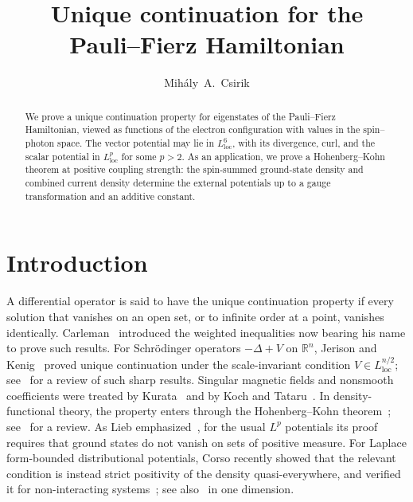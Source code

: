 \documentclass[final,reqno]{amsart}
\title[Unique continuation for the Pauli--Fierz Hamiltonian]{Unique continuation for the\\
Pauli--Fierz Hamiltonian}
\author[M.\,A. Csirik]{Mih\'aly~A.~Csirik}
\theoremstyle{remark}
\newcommand{\RR}{\mathbb{R}}
\begin{document}
\begin{abstract}
We prove a unique continuation property for eigenstates of the Pauli--Fierz
Hamiltonian, viewed as functions of the electron
configuration with values in the spin--photon space.
The vector potential may lie in $L^6_\mathrm{loc}$, with
its divergence, curl, and the scalar potential in $L^p_\mathrm{loc}$ for some
$p>2$.  As an application, we prove a Hohenberg--Kohn theorem at
positive coupling strength: the spin-summed ground-state density and
combined current density determine the external potentials up to a
gauge transformation and an additive constant.
\end{abstract}
\maketitle

\section{Introduction}\label{sec-intro}

A differential operator is said to have the unique continuation property if every
solution that vanishes on an open set, or to infinite order at a point,
vanishes identically.  Carleman~\cite{carleman1939probleme} introduced
the weighted inequalities now bearing his name to prove such
results.  For Schr\"odinger operators $-\Delta+V$ on $\RR^n$,
Jerison and Kenig~\cite{jerison1985unique} proved unique continuation under the scale-invariant
condition $V\in L^{n/2}_\mathrm{loc}$; see~\cite{wolff1993recent} for a
review of such sharp results.  Singular magnetic fields and
nonsmooth coefficients were treated by Kurata~\cite{kurata1997unique}
and by Koch and Tataru~\cite{koch2001carleman}.  In density-functional
theory, the property enters through the Hohenberg--Kohn
theorem~\cite{hohenberg1964inhomogeneous}; see~\cite{lewin2023universal}
for a review.  As Lieb
emphasized~\cite{lieb1983density}, for the usual $L^p$ potentials its
proof requires that ground states do not vanish on sets of positive
measure.  For Laplace form-bounded distributional potentials, Corso
recently showed that the relevant condition is instead strict
positivity of the density quasi-everywhere, and verified it for
non-interacting systems~\cite{corso2026maximal}; see
also~\cite{corso2025torus,corso2026spinless} in one dimension.
\end{document}
